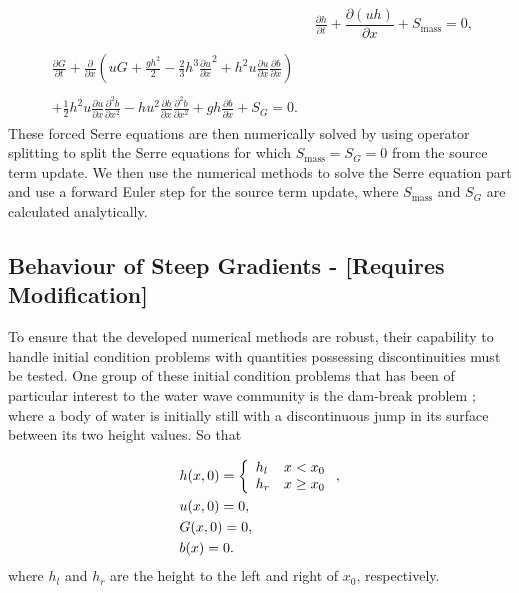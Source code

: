 \begin{subequations}
	\label{eqn:FullSerreConForced}
	\begin{align}
	& \frac{\partial h}{\partial t} + \dfrac{\partial (uh)}{\partial x} + S_{\text{mass}}  = 0 ,\label{eqn:FullSerreConMassForced}  \\ \nonumber \\
	\begin{split}
	\label{eqn:SerreconsconmomForced}
	\frac{\partial G}{\partial t}  + \frac{\partial}{\partial x} \left( {u} G + \frac{gh^2}{2} - \frac{2}{3}h^3 \frac{\partial {u}}{\partial x}^2 + h^2 {u}\frac{\partial {u}}{\partial x}\frac{\partial b}{\partial x} \right) \\ \\ + \frac{1}{2}h^2 {u} \frac{\partial {u}}{\partial x} \frac{\partial^2 b}{\partial x^2}  - h {u}^2\frac{\partial b}{\partial x}\frac{\partial^2 b}{\partial x^2} + gh\frac{\partial b}{\partial x} + S_{G} = 0.
	\end{split}
	\end{align}
\end{subequations}
These forced Serre equations are then numerically solved by using operator splitting to split the Serre equations for which $S_{\text{mass}} = S_{G} = 0$ from the source term update. We then use the numerical methods to solve the Serre equation part and use a forward Euler step for the source term update, where $S_{\text{mass}}$ and $S_{G}$ are calculated analytically. 

\subsection{Behaviour of Steep Gradients - [Requires Modification]}
To ensure that the developed numerical methods are robust, their capability to handle initial condition problems with quantities possessing discontinuities must be tested. One group of these initial condition problems that has been of particular interest to the water wave community is the dam-break problem \cite{El-etal-2006,Hank-etal-2010-2034,Mitsotakis-etal-2014,Mitsotakis-etal-2017,doCarmo-etal-2018-404}; where a body of water is initially still with a discontinuous jump in its surface between its two height values. So that

\begin{subequations}
	\begin{align}
	&h(x,0) =\left\lbrace \begin{array}{l r}
	h_l & x < x_0 \\
	h_r & x \ge x_0
	\end{array} \right., \\
	&u(x,0) = 0 , \\
	&G(x,0) = 0 , \\
	&b(x) = 0.
	\end{align}
	\label{eqn:DBdefhub}
\end{subequations} 
where $h_l$ and $h_r$ are the height to the left and right of $x_0$, respectively. 

